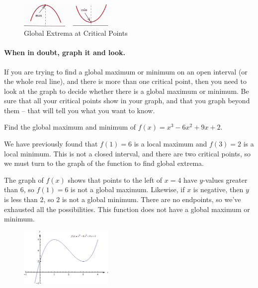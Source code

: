 \begin{figure}[!ht]
  \centering
    \includegraphics[width=0.4\textwidth]{img/chap3/image065.png}
    \caption{Global Extrema at Critical Points}
    \label{fig:3-4-65}
\end{figure}
\paragraph*{When in doubt, graph it and look.}
If you are trying to find a global maximum or minimum on an open interval (or the whole real line), and there is more than one critical point, then you need to look at the graph to decide whether there is a global maximum or minimum. Be sure that all your critical points show in your graph, and that you graph beyond them -- that will tell you what you want to know.

\begin{example}
Find the global maximum and minimum of $f(x)=x^3-6x^2+9x+2$.

\begin{solution} We have previously found that $f(1) = 6$ is a local maximum and $f(3)= 2$ is a local minimum. This is not a closed interval, and there are two critical points, so we must turn to the graph of the function to find global extrema.

The graph of $f(x)$ shows that points to the left of $x=4$ have $y$-values greater than 6, so $f(1)= 6$ is not a global maximum. Likewise, if $x$ is negative, then $y$ is less than 2, so $2$ is not a global minimum. There are no endpoints, so we've exhausted all the possibilities. This function does not have a global maximum or minimum.

\begin{figure}[!ht]
  \centering
    \includegraphics[width=0.4\textwidth]{img/chap3/image058.png}
\end{figure}
\end{solution}
\end{example}

